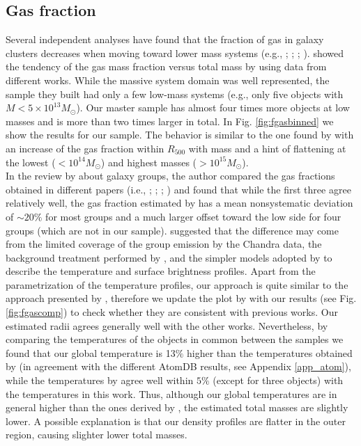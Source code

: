 \documentclass{aa} %
\begin{document}
\subsection{Gas fraction} \label{fgasdiscuss} Several independent
analyses have found that the fraction of gas in galaxy clusters
decreases when moving toward lower mass systems
(e.g., \citealt{2003MNRAS.340..989S}; \citealt{2006ApJ...640..691V};
\citealt{2007ApJ...669..158G}; \citealt{2009A&A...498..361P}). \cite{2009A&A...498..361P} showed the tendency of the gas mass
fraction versus total mass by using data from different
works. While the massive system domain was well represented, the
sample they built had only a few low-mass systems (e.g., only five objects
with $M<5\times10^{13}M_{\odot}$). Our master sample has almost four times more objects at low masses and is more than two times larger in
total. In Fig. \ref{fig:fgasbinned} we show the results for our
sample. The behavior is similar to the one found by \citet{2009A&A...498..361P} with an increase of the gas fraction within $R_{500}$ with mass and a hint of flattening at the lowest ($<$$10^{14}M_{\odot}$) and highest masses ($>$$10^{15}M_{\odot}$). \\
In the review by \citet{2012NJPh...14d5004S} about galaxy groups, the
author compared the gas fractions obtained in different papers (i.e., \citealt{2006ApJ...640..691V}; 
 \citealt{2007ApJ...669..158G}; \citealt{2009ApJ...693.1142S};
 \citealt{2011A&A...535A.105E}) and found that while the first three agree relatively well, the gas fraction estimated by \citet{2011A&A...535A.105E} has a mean nonsystematic deviation of $\sim20\%$ for most groups and a much larger offset toward the low side for four groups (which are not in our sample). \citet{2012NJPh...14d5004S} suggested that the difference may come from the limited coverage of the group emission by the Chandra data, the background treatment performed by \citet{2011A&A...535A.105E}, and the simpler models adopted by
\citet{2011A&A...535A.105E} to describe the temperature and surface brightness profiles. 
Apart from the parametrization of the
temperature profiles, our approach is quite similar to the approach 
presented by \citet{2011A&A...535A.105E}, therefore we update the plot by
\citet{2012NJPh...14d5004S} with our results (see Fig. \ref{fig:fgascomp}) to check whether they are consistent with previous works. 
Our estimated radii agrees generally well with the other works. Nevertheless, by comparing the  temperatures of the objects in common between the samples we found that our global temperature is 13$\%$ higher than the temperatures obtained by \citet{2009ApJ...693.1142S} (in agreement with the different AtomDB results, see Appendix \ref{app_atom}), while the temperatures by \citet{2011A&A...535A.105E} agree  well within $5\%$ (except for three objects) with the temperatures in this work. Thus, although our global temperatures are in general higher than the ones derived by \citet{2009ApJ...693.1142S}, the estimated total masses are slightly lower. A possible explanation is that our density profiles are flatter in the outer region, causing slighter lower total masses. \\
\end{document}
